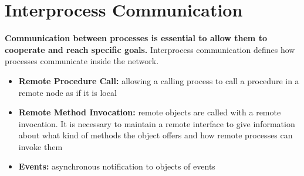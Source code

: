 \chapter{Interprocess Communication}
\textbf{Communication between processes is essential to allow them to cooperate and reach specific goals.} Interprocess communication defines how processes communicate inside the network.
\begin{itemize}
    \item \textbf{Remote Procedure Call:} allowing a calling process to call a procedure in a remote node as if it is local
    \item \textbf{Remote Method Invocation:} remote objects are called with a remote invocation. It is necessary to maintain a remote interface to give information about what kind of methods the object offers and how remote processes can invoke them
    \item \textbf{Events:} asynchronous notification to objects of events
\end{itemize}

